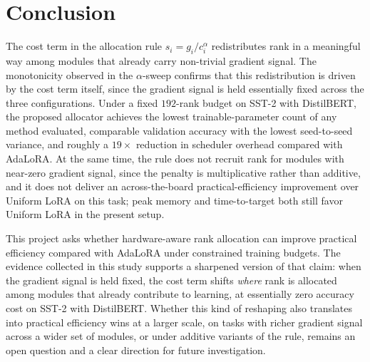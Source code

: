 \documentclass{article}
\begin{document}
\section{Conclusion}
\label{sec:conclusion}

The cost term in the allocation rule $s_i = g_i / c_i^{\alpha}$
redistributes rank in a meaningful way among modules that already
carry non-trivial gradient signal. The monotonicity observed in the
$\alpha$-sweep confirms that this redistribution is driven by the
cost term itself, since the gradient signal is held essentially
fixed across the three configurations. Under a fixed $192$-rank
budget on SST-2 with DistilBERT, the proposed allocator achieves the
lowest trainable-parameter count of any method evaluated, comparable
validation accuracy with the lowest seed-to-seed variance, and
roughly a $19\times$ reduction in scheduler overhead compared with
AdaLoRA. At the same time, the rule does not recruit rank for
modules with near-zero gradient signal, since the penalty is
multiplicative rather than additive, and it does not deliver an
across-the-board practical-efficiency improvement over Uniform LoRA
on this task; peak memory and time-to-target both still favor
Uniform LoRA in the present setup.

This project asks whether hardware-aware rank allocation can improve
practical efficiency compared with AdaLoRA under constrained training
budgets. The evidence collected in this study supports a sharpened
version of that claim: when the gradient signal is held fixed, the
cost term shifts \emph{where} rank is allocated among modules that
already contribute to learning, at essentially zero accuracy cost on
SST-2 with DistilBERT. Whether this kind of reshaping also
translates into practical efficiency wins at a larger scale, on
tasks with richer gradient signal across a wider set of modules, or
under additive variants of the rule, remains an open question and a
clear direction for future investigation.



\end{document}
